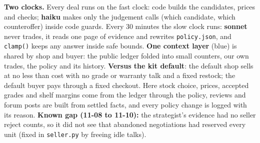 \documentclass[10pt]{article}
\begin{document}

\vspace{2mm}
\begin{minipage}{250mm}\footnotesize
\textbf{Two clocks.} Every deal runs on the fast clock: code builds the candidates, prices and checks; \textbf{haiku} makes only the
judgement calls (which candidate, which counteroffer) inside code guards. Every 30 minutes the slow clock runs: \textbf{sonnet} never
trades, it reads one page of evidence and rewrites \texttt{policy.json}, and \texttt{clamp()} keeps any answer inside safe bounds.
\textbf{One context layer} (blue) is shared by shop and buyer: the public ledger folded into small counters, our own trades,
the policy and its history. \textbf{Versus the kit default}: the default shop sells at no less than cost with no grade or warranty
talk and a fixed restock; the default buyer pays through a fixed checkout. Here stock choice, prices, accepted grades and
shelf margins come from the ledger through the policy, reviews and forum posts are built from settled facts, and every policy change
is logged with its reason. \textbf{Known gap (11-08 to 11-10):} the strategist's evidence had no seller reject counts, so it did not
see that abandoned negotiations had reserved every unit (fixed in \texttt{seller.py} by freeing idle talks).
\end{minipage}
\end{document}

